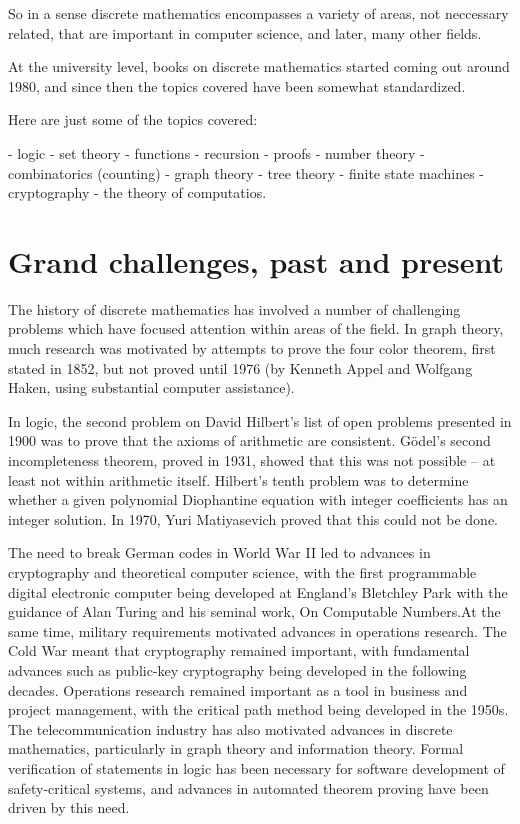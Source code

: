 \documentclass{article}
\begin{document}
So in a sense discrete mathematics encompasses a variety of areas, not neccessary related, that are important in computer science, and later, many other fields.

At the university level, books on discrete mathematics started coming out around 1980, and since then the topics covered have been somewhat standardized.

Here are just some of the topics covered:

- logic
- set theory
- functions
- recursion
- proofs
- number theory
- combinatorics (counting)
- graph theory
- tree theory
- finite state machines
- cryptography
- the theory of computatios.
\section{Grand challenges, past and present}
The history of discrete mathematics has involved a number of challenging problems which have focused attention within areas of the field. In graph theory, much research was motivated by attempts to prove the four color theorem, first stated in 1852, but not proved until 1976 (by Kenneth Appel and Wolfgang Haken, using substantial computer assistance).

In logic, the second problem on David Hilbert's list of open problems presented in 1900 was to prove that the axioms of arithmetic are consistent. Gödel's second incompleteness theorem, proved in 1931, showed that this was not possible – at least not within arithmetic itself. Hilbert's tenth problem was to determine whether a given polynomial Diophantine equation with integer coefficients has an integer solution. In 1970, Yuri Matiyasevich proved that this could not be done.

The need to break German codes in World War II led to advances in cryptography and theoretical computer science, with the first programmable digital electronic computer being developed at England's Bletchley Park with the guidance of Alan Turing and his seminal work, On Computable Numbers.At the same time, military requirements motivated advances in operations research. The Cold War meant that cryptography remained important, with fundamental advances such as public-key cryptography being developed in the following decades. Operations research remained important as a tool in business and project management, with the critical path method being developed in the 1950s. The telecommunication industry has also motivated advances in discrete mathematics, particularly in graph theory and information theory. Formal verification of statements in logic has been necessary for software development of safety-critical systems, and advances in automated theorem proving have been driven by this need.
\end{document}
